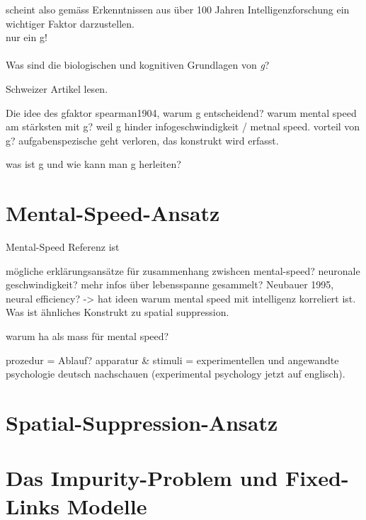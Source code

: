\documentclass[11pt, twoside, a4paper]{book}		%
\begin{document}
scheint also gemäss Erkenntnissen aus über 100 Jahren Intelligenzforschung ein wichtiger Faktor darzustellen. 
\citep{Jensen1994}\\



\citep{Johnson2004, Johnson2008} nur ein g!\\
\citet{Visser2006}\\





{Was sind die biologischen und kognitiven Grundlagen von \textit{g}?}

Schweizer Artikel lesen.

Die idee des gfaktor
spearman1904, warum g entscheidend? warum mental speed am stärksten mit g? weil g hinder infogeschwindigkeit / metnal speed.
vorteil von g? aufgabenspezische geht verloren, das konstrukt wird erfasst.

was ist g und wie kann man g herleiten?



\section{Mental-Speed-Ansatz \label{sec:lol}}

Mental-Speed Referenz ist \citet{Jensen1982b}


mögliche erklärungsansätze für zusammenhang zwishcen mental-speed? neuronale geschwindigkeit? mehr infos über lebensspanne gesammelt?
Neubauer 1995, neural efficiency? -> hat ideen warum mental speed mit intelligenz korreliert ist. Was ist ähnliches Konstrukt zu spatial suppression.
\vspace{2cm}


warum ha als mass für mental speed?

prozedur = Ablauf?
apparatur \& stimuli = 
experimentellen und angewandte psychologie deutsch nachschauen (experimental psychology jetzt auf englisch).

\citep{Doebler2015}

\section{Spatial-Suppression-Ansatz \label{sec:Spatial_Suppression}}





\section{Das Impurity-Problem und Fixed-Links Modelle}
\end{document}

